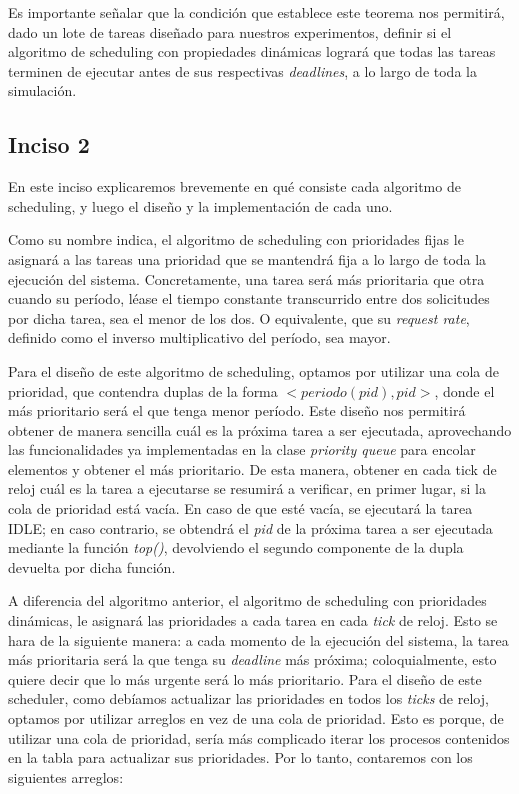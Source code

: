 Es importante se\~nalar que la condici\'on que establece este teorema nos permitir\'a, dado un lote de tareas dise\~nado para nuestros experimentos, definir 
si el algoritmo de scheduling con propiedades din\'amicas lograr\'a que todas las tareas terminen de ejecutar antes de sus respectivas \textit{deadlines}, a lo 
largo de toda la simulaci\'on.

\subsection*{Inciso 2}

En este inciso explicaremos brevemente en qu\'e consiste cada algoritmo de scheduling, y luego el dise\~no y la implementaci\'on de cada uno.

Como su nombre indica, el algoritmo de scheduling con prioridades fijas le asignar\'a a las tareas una prioridad que se mantendr\'a fija a lo largo de 
toda la ejecuci\'on del sistema. Concretamente, una tarea ser\'a m\'as prioritaria que otra cuando su per\'iodo, l\'ease el tiempo constante transcurrido entre
dos solicitudes por dicha tarea, sea el menor de los dos. O equivalente, que su \textit{request rate}, definido como el inverso multiplicativo del per\'iodo,
sea mayor. 

Para el dise\~no de este algoritmo de scheduling, optamos por utilizar una cola de prioridad, que contendra duplas de la forma 
$<periodo(pid),pid>$, donde el m\'as prioritario ser\'a el que tenga menor per\'iodo. Este dise\~no nos permitir\'a obtener de manera sencilla cu\'al es
la pr\'oxima tarea a ser ejecutada, aprovechando las funcionalidades ya implementadas en la clase \textit{priority queue} para encolar elementos y obtener
el m\'as prioritario. De esta manera, obtener en cada tick de reloj cu\'al es la tarea a ejecutarse se resumir\'a a verificar, en primer lugar, si la 
cola de prioridad est\'a vac\'ia. En caso de que est\'e vac\'ia, se ejecutar\'a la tarea IDLE; en caso contrario, se obtendr\'a el \textit{pid} de la 
pr\'{o}xima tarea a ser ejecutada mediante la funci\'on \textit{top()}, devolviendo el segundo componente de la dupla devuelta por dicha funci\'on.

A diferencia del algoritmo anterior, el algoritmo de scheduling con prioridades din\'amicas, le asignar\'a las prioridades a cada tarea en cada
\textit{tick} de reloj. Esto se hara de la siguiente manera: a cada momento de la ejecuci\'on del sistema, la tarea m\'as prioritaria ser\'a la que
tenga su \textit{deadline} m\'as pr\'oxima; coloquialmente, esto quiere decir que lo m\'as urgente ser\'a lo m\'as prioritario. Para el dise\~no de
este scheduler, como deb\'iamos actualizar las prioridades en todos los \textit{ticks} de reloj, optamos por utilizar arreglos en vez de una cola de 
prioridad. Esto es porque, de utilizar una cola de prioridad, ser\'ia m\'as complicado iterar los procesos contenidos en la tabla para actualizar sus prioridades.
Por lo tanto, contaremos con los siguientes arreglos:

